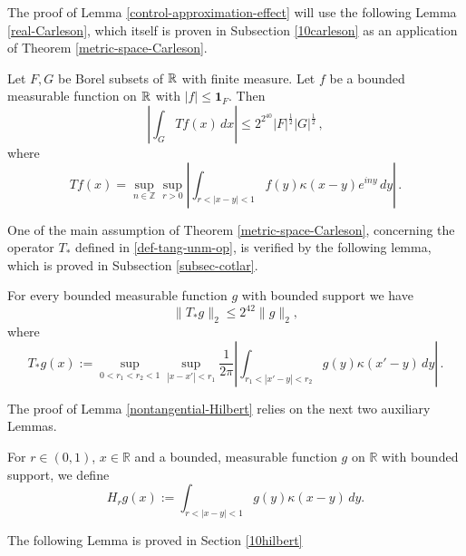 {The proof of Lemma \ref{control-approximation-effect} will
use the following Lemma \ref{real-Carleson}, which itself is proven
 in Subsection \ref{10carleson} as an application of
 Theorem \ref{metric-space-Carleson}.
\begin{lemma}\label{real-Carleson}
    Let $F,G$ be Borel subsets of ${\mathbb{R}}$ with finite measure. Let $f$ be a bounded measurable function on ${\mathbb{R}}$ with $|f|\le \mathbf{1}_F$. Then
\begin{equation}
    \left|\int _G Tf(x) \, dx\right| \le 2^{2^{40}}|F|^{\frac 12} |G|^{\frac 12} \, ,
\end{equation}
where
\begin{equation}
    \label{define-T-carleson}
    T f(x)=\sup_{n\in \mathbb{Z}}
    \sup_{r>0}\left|\int_{r<|x-y|<1} f(y)\kappa(x-y) e^{iny}\, dy\right|\, .
\end{equation}
\end{lemma}


One of the main assumption of Theorem \ref{metric-space-Carleson}, concerning the operator $T_*$ defined in \eqref{def-tang-unm-op}, is verified by the following lemma, which is proved in Subsection \ref{subsec-cotlar}.


\begin{lemma}\label{nontangential-Hilbert}
    For every  bounded measurable function $g$ with bounded support we have
\begin{equation}\label{concretetstarbound}
    \|T_*g\|_2\le 2^{42}\|g\|_2,
\end{equation}
where
\begin{equation}\label{concretetstar}
    T_* g(x):=\sup_{0<r_1<r_2<1}\sup_{|x-x'|<r_1}\frac 1{2\pi} \left|\int_{r_1<|x'-y|<r_2}
g(y) \kappa(x'-y)\, dy\right|\, .
\end{equation}
\end{lemma}
The proof of Lemma \ref{nontangential-Hilbert} relies on the next two auxiliary Lemmas.

For $r\in (0,1)$, $x\in \mathbb{R}$ and a bounded, measurable function $g$ on $\mathbb{R}$ with bounded support, we define
\begin{equation}
\label{def-H_r}
H_r g(x):= \int_{r<|x-y|<1}
g(y) \kappa(x-y)\, dy.
\end{equation}

The following Lemma is proved in Section \ref{10hilbert}


}
